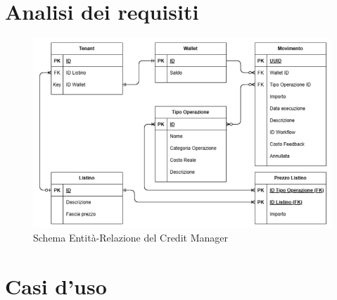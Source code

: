 \section{Analisi dei requisiti}
\begin{figure}[H]
  \centering
  \includegraphics[width=13cm]{images/er-diagram.jpg}
  \caption{Schema Entit\`a-Relazione del Credit Manager}
\end{figure}

\section{Casi d'uso}
